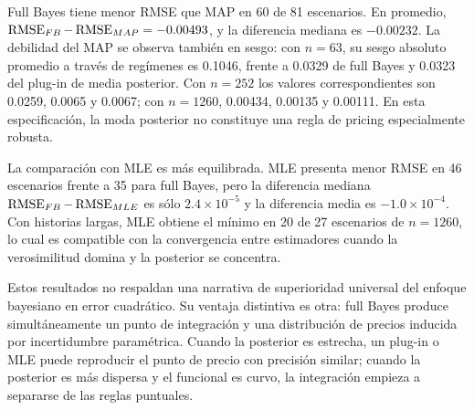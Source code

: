 Full Bayes tiene menor RMSE que MAP en 60 de 81 escenarios. En promedio, $\operatorname{RMSE}_{FB}-\operatorname{RMSE}_{MAP}=-0.00493$, y la diferencia mediana es $-0.00232$. La debilidad del MAP se observa también en sesgo: con $n=63$, su sesgo absoluto promedio a través de regímenes es 0.1046, frente a 0.0329 de full Bayes y 0.0323 del plug-in de media posterior. Con $n=252$ los valores correspondientes son 0.0259, 0.0065 y 0.0067; con $n=1260$, 0.00434, 0.00135 y 0.00111. En esta especificación, la moda posterior no constituye una regla de pricing especialmente robusta.

La comparación con MLE es más equilibrada. MLE presenta menor RMSE en 46 escenarios frente a 35 para full Bayes, pero la diferencia mediana $\operatorname{RMSE}_{FB}-\operatorname{RMSE}_{MLE}$ es sólo $2.4\times10^{-5}$ y la diferencia media es $-1.0\times10^{-4}$. Con historias largas, MLE obtiene el mínimo en 20 de 27 escenarios de $n=1260$, lo cual es compatible con la convergencia entre estimadores cuando la verosimilitud domina y la posterior se concentra.

Estos resultados no respaldan una narrativa de superioridad universal del enfoque bayesiano en error cuadrático. Su ventaja distintiva es otra: full Bayes produce simultáneamente un punto de integración y una distribución de precios inducida por incertidumbre paramétrica. Cuando la posterior es estrecha, un plug-in o MLE puede reproducir el punto de precio con precisión similar; cuando la posterior es más dispersa y el funcional es curvo, la integración empieza a separarse de las reglas puntuales.

